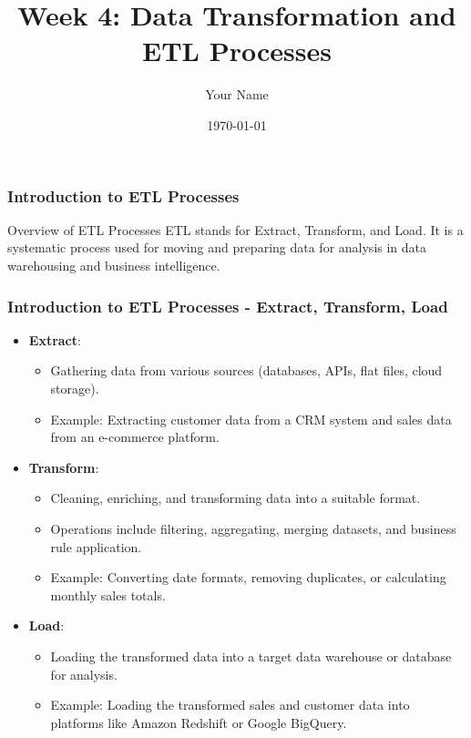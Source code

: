 \documentclass{beamer}
\title{Week 4: Data Transformation and ETL Processes}
\author{Your Name}
\institute{Your Institution}
\date{\today}
\begin{document}
\frame{\titlepage}

\begin{frame}[fragile]
    \frametitle{Introduction to ETL Processes}
    \begin{block}{Overview of ETL Processes}
        ETL stands for Extract, Transform, and Load. It is a systematic process used for moving and preparing data for analysis in data warehousing and business intelligence.
    \end{block}
\end{frame}

\begin{frame}[fragile]
    \frametitle{Introduction to ETL Processes - Extract, Transform, Load}
    \begin{itemize}
        \item \textbf{Extract}:
            \begin{itemize}
                \item Gathering data from various sources (databases, APIs, flat files, cloud storage).
                \item Example: Extracting customer data from a CRM system and sales data from an e-commerce platform.
            \end{itemize}
        \item \textbf{Transform}:
            \begin{itemize}
                \item Cleaning, enriching, and transforming data into a suitable format.
                \item Operations include filtering, aggregating, merging datasets, and business rule application.
                \item Example: Converting date formats, removing duplicates, or calculating monthly sales totals.
            \end{itemize}
        \item \textbf{Load}:
            \begin{itemize}
                \item Loading the transformed data into a target data warehouse or database for analysis.
                \item Example: Loading the transformed sales and customer data into platforms like Amazon Redshift or Google BigQuery.
            \end{itemize}
    \end{itemize}
\end{frame}
\end{document}
